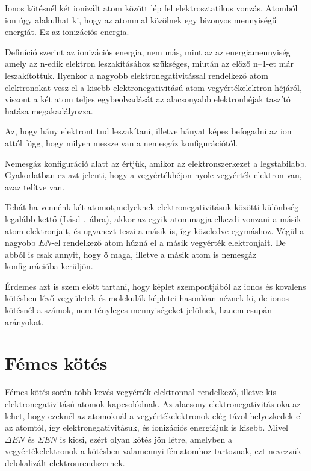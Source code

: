 \documentclass[colorlinks]{thesis-ekf}
\theoremstyle{definition}
\theoremstyle{remark}
\begin{document}
Ionos kötésnél két ionizált atom között lép fel elektrosztatikus vonzás.
Atomból ion úgy alakulhat ki, hogy az atommal közölnek egy bizonyos mennyiségű energiát. Ez az ionizációs energia. 

Definíció szerint az ionizációs energia, nem más, mint az az energiamennyiség  amely az n-edik elektron leszakításához szükséges, miután az előző n–1-et már leszakítottuk.\cite{miskolc_kemia}
Ilyenkor a nagyobb elektronegativitással rendelkező atom elektronokat vesz el a kisebb elektronegativitású atom vegyértékelektron héjáról, viszont a két atom teljes egybeolvadását az alacsonyabb elektronhéjak taszító hatása megakadályozza.\cite{miskolc_kemia}

Az, hogy hány elektront tud leszakítani, illetve hányat képes befogadni az ion attól függ, hogy milyen messze van a nemesgáz konfigurációtól.

Nemesgáz konfiguráció alatt az értjük, amikor az elektronszerkezet a legstabilabb. Gyakorlatban ez azt jelenti, hogy a vegyértékhéjon nyolc vegyérték elektron van, azaz telítve van.\cite{ionos_vidi}

Tehát ha vennénk két atomot,melyeknek elektronegativitásuk közötti különbség legalább kettő (Lásd .~ábra), akkor az egyik atommagja elkezdi vonzani a másik atom elektronjait, és ugyanezt teszi a másik is, így közeledve egymáshoz. Végül a nagyobb \begin{math} EN\end{math}-el rendelkező atom húzná el a másik vegyérték elektronjait. De abból is csak annyit, hogy ő maga, illetve a másik atom is nemesgáz konfigurációba kerüljön. \cite{ionos_vidi}

Érdemes azt is szem előtt tartani, hogy képlet szempontjából az ionos és kovalens kötésben lévő vegyületek és molekulák képletei hasonlóan néznek ki, de ionos kötésnél a számok, nem tényleges mennyiségeket jelölnek, hanem csupán arányokat.\cite{ionos_vidi}
\section{Fémes kötés}

Fémes kötés során több kevés vegyérték elektronnal rendelkező, illetve kis elektronegativitású atomok kapcsolódnak. Az alacsony elektronegativitás oka az lehet, hogy ezeknél az atomoknál a vegyértékelektronok elég távol helyezkedek el az atomtól, így elektronegativitásuk, és ionizációs energiájuk is kisebb. Mivel \begin{math}\Delta EN\end{math} és \begin{math}\Sigma EN\end{math} is kicsi, ezért olyan kötés jön létre, amelyben a vegyértékelektronok a kötésben valamennyi fématomhoz tartoznak, ezt nevezzük delokalizált elektronrendszernek.\cite{miskolc_kemia}
\end{document}
